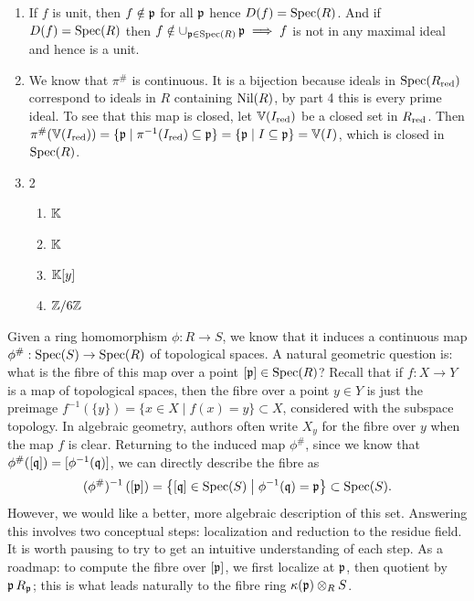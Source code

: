 \documentclass[Notebook.tex]{subfiles}
\begin{document}
\begin{solution}
\begin{enumerate}
        \item If $f$ is unit, then $f \notin \operatorname{\mathfrak{p}}$ for all $\operatorname{\mathfrak{p}}$ hence $D(f) = \operatorname{Spec}(R)$. And if $D(f) = \operatorname{Spec}(R)$ then $f \notin \cup_{\operatorname{\mathfrak{p}} \in \operatorname{Spec}(R)}\operatorname{\mathfrak{p}} \implies f$ is not in any maximal ideal and hence is a unit. 
        
        \item We know that $\pi^{\#}$ is continuous. It is a bijection because ideals in $\operatorname{Spec}(R_{\text{red}})$ correspond to ideals in $R$ containing $\text{Nil}(R)$, by part 4 this is every prime ideal. To see that this map is closed, let $\mathbb V(I_{\text{red}})$ be a closed set in $R_{\text{red}}$. Then $\pi^{\#}(\mathbb V(I_{\text{red}})) = \{\operatorname{\mathfrak{p}} \mid \pi^{-1}{(I_{\text{red}})} \subseteq \operatorname{\mathfrak{p}}\} = \{\operatorname{\mathfrak{p}} \mid I \subseteq \operatorname{\mathfrak{p}}\} = \mathbb V(I)$, which is closed in $\operatorname{Spec}(R)$.   
        
        \item \begin{multicols}{2}
        \begin{enumerate}
            \item $\mathbb K$
            \item $\mathbb K$
            \item $\mathbb K[y]$
            \item $\mathbb Z/6\mathbb Z$
        \end{enumerate}
        \end{multicols}
    \end{enumerate}
\end{solution}

\newpage 

\hrulefill

Given a ring homomorphism $\phi:R \to S$, we know that it induces a continuous map $\phi^{\#}: \operatorname{Spec}(S) \to \operatorname{Spec}(R)$ of topological spaces. A natural geometric question is: what is the fibre of this map over a point $[\operatorname{\mathfrak{p}}] \in \operatorname{Spec}(R)$? Recall that if $f:X \to Y$ is a map of topological spaces, then the fibre over a point $y \in Y$ is just the preimage $f^{-1}(\{y\})=\{x \in X \mid f(x)=y\} \subset X$, considered with the subspace topology. In algebraic geometry, authors often write $X_y$ for the fibre over $y$ when the map $f$ is clear. Returning to the induced map $\phi^{\#}$, since we know that $\phi^{\#}([\operatorname{\mathfrak{q}}])=[\phi^{-1}(\operatorname{\mathfrak{q}})]$, we can directly describe the fibre as
\[
(\phi^{\#})^{-1}\left([\operatorname{\mathfrak{p}}]\right) = \left\{ [\operatorname{\mathfrak{q}}] \in \operatorname{Spec}(S) \;\middle|\; \phi^{-1}(\operatorname{\mathfrak{q}})=\operatorname{\mathfrak{p}} \right\} \subset \operatorname{Spec}(S).
\]
However, we would like a better, more algebraic description of this set. Answering this involves two conceptual steps: localization and reduction to the residue field. It is worth pausing to try to get an intuitive understanding of each step. As a roadmap: to compute the fibre over $[\operatorname{\mathfrak{p}}]$, we first localize at $\operatorname{\mathfrak{p}}$, then quotient by $\operatorname{\mathfrak{p}} R_{\operatorname{\mathfrak{p}}}$; this is what leads naturally to the fibre ring $\kappa(\operatorname{\mathfrak{p}})\otimes_R S$.
\end{document}
